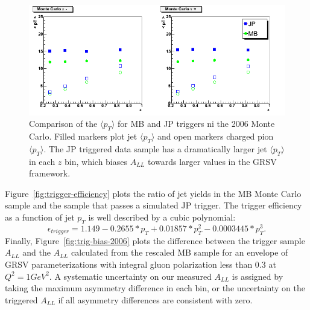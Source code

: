 \begin{figure}
  \includegraphics[width=1.0\textwidth]{figures/meanpt-by-trigger}
  \caption{Comparison of the $\langle p_T \rangle$ for MB and JP triggers ni the 2006 Monte Carlo.  Filled markers plot jet $\langle p_T \rangle$ and open markers charged pion $\langle p_T \rangle$. The JP triggered data sample has a dramatically larger jet $\langle p_T \rangle$ in each $z$ bin, which biases $A_{LL}$ towards larger values in the GRSV framework.}
  \label{fig:mean-pt-simu}
\end{figure}

Figure~\ref{fig:trigger-efficiency} plots the ratio of jet yields in the MB Monte Carlo sample and the sample that passes a simulated JP trigger.  The trigger efficiency as a function of jet \(p_T\) is well described by a cubic polynomial:
%
\begin{equation}
  \epsilon_{trigger} = 1.149 - 0.2655 * p_T   + 0.01857 * p_T^2 - 0.0003445 * p_T^3.
  \label{eqn:trigger-efficiency}
\end{equation}
%
Finally, Figure~\ref{fig:trig-bias-2006} plots the difference between the trigger sample \(A_{LL}\) and the \(A_{LL}\) calculated from the rescaled MB sample for an envelope of GRSV parameterizations with integral gluon polarization less than 0.3 at \(Q^2 = 1 GeV^2\).  A systematic uncertainty on our measured \(A_{LL}\) is assigned by taking the maximum asymmetry difference in each bin, or the uncertainty on the triggered \(A_{LL}\) if all asymmetry differences are consistent with zero.


